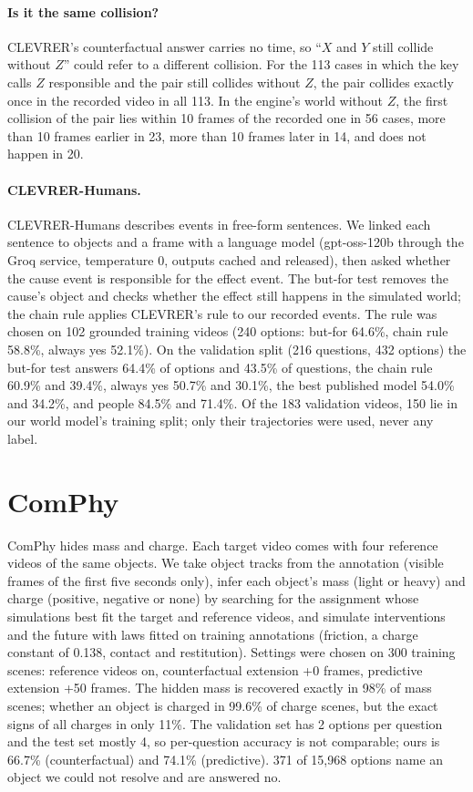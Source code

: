 \paragraph{Is it the same collision?}
CLEVRER's counterfactual answer carries no time, so ``$X$ and $Y$ still collide without $Z$'' could refer to a different collision.
For the 113 cases in which the key calls $Z$ responsible and the pair still collides without $Z$, the pair collides exactly once in the recorded video in all 113.
In the engine's world without $Z$, the first collision of the pair lies within 10 frames of the recorded one in 56 cases, more than 10 frames earlier in 23, more than 10 frames later in 14, and does not happen in 20.

\paragraph{CLEVRER-Humans.}
CLEVRER-Humans describes events in free-form sentences.
We linked each sentence to objects and a frame with a language model (gpt-oss-120b through the Groq service, temperature 0, outputs cached and released), then asked whether the cause event is responsible for the effect event.
The but-for test removes the cause's object and checks whether the effect still happens in the simulated world; the chain rule applies CLEVRER's rule to our recorded events.
The rule was chosen on 102 grounded training videos (240 options: but-for 64.6\%, chain rule 58.8\%, always yes 52.1\%).
On the validation split (216 questions, 432 options) the but-for test answers 64.4\% of options and 43.5\% of questions, the chain rule 60.9\% and 39.4\%, always yes 50.7\% and 30.1\%, the best published model 54.0\% and 34.2\%, and people 84.5\% and 71.4\%.
Of the 183 validation videos, 150 lie in our world model's training split; only their trajectories were used, never any label.

\section{ComPhy}
\label{app:comphy}

ComPhy hides mass and charge. Each target video comes with four reference videos of the same objects.
We take object tracks from the annotation (visible frames of the first five seconds only), infer each object's mass (light or heavy) and charge (positive, negative or none) by searching for the assignment whose simulations best fit the target and reference videos, and simulate interventions and the future with laws fitted on training annotations (friction, a charge constant of 0.138, contact and restitution).
Settings were chosen on 300 training scenes: reference videos on, counterfactual extension +0 frames, predictive extension +50 frames.
The hidden mass is recovered exactly in 98\% of mass scenes; whether an object is charged in 99.6\% of charge scenes, but the exact signs of all charges in only 11\%.
The validation set has 2 options per question and the test set mostly 4, so per-question accuracy is not comparable; ours is 66.7\% (counterfactual) and 74.1\% (predictive).
371 of 15,968 options name an object we could not resolve and are answered no.

